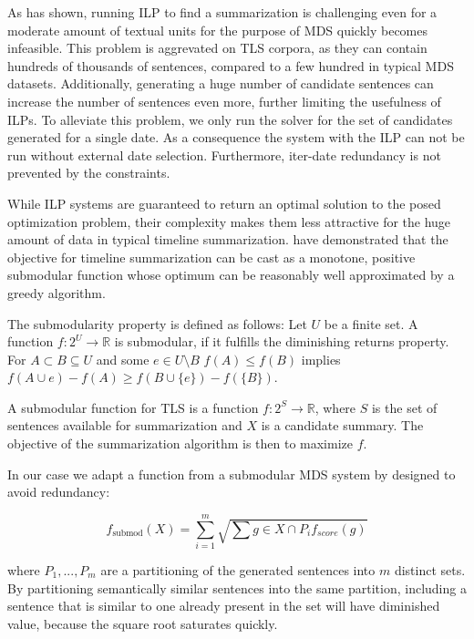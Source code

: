 \documentclass[a4paper,BCOR=10mm]{report}
\begin{document}
As \citet{mcdonald} has shown, running ILP to find a summarization is challenging even for a moderate amount of textual units for the purpose of MDS quickly becomes infeasible.
This problem is aggrevated on TLS corpora, as they can contain hundreds of thousands of sentences, compared to a few hundred in typical MDS datasets. Additionally, generating a huge number of candidate sentences can increase the number of sentences even more, further limiting the usefulness of ILPs.
To alleviate this problem, we only run the solver for the set of candidates generated for a single date. As a consequence the system with the ILP can not be run without external date selection. Furthermore, iter-date redundancy is not prevented by the constraints.


While ILP systems are guaranteed to return an optimal solution to the posed optimization problem, their complexity makes them less attractive for the huge amount of data in typical timeline summarization. \citet{markert} have demonstrated that the objective for timeline summarization can be cast as a monotone, positive submodular function whose optimum can be reasonably well approximated by a greedy algorithm.

The submodularity property is defined as follows:
 Let $U$ be a finite set. A function $f: 2^{U} \rightarrow \mathbb{R}$ is submodular, if it fulfills the diminishing returns property. For $A \subset B \subseteq U$ and some $e \in U \setminus B$ $f(A) \leq f(B)$ implies $f(A \cup e) - f(A) \geq f(B \cup \{e\}) - f(\{B\})$.

A submodular function for TLS is a function $f: 2^{S} \rightarrow \mathbb{R}$, where $S$ is the set of sentences available for summarization and $X$ is a candidate summary.
The objective of the summarization algorithm is then to maximize $f$.

In our case we adapt a function from a submodular MDS system by \citet{lin+blimes} designed to avoid redundancy:

\begin{displaymath}
f_{\text{submod}}(X) = \sum_{i = 1}^{m} \sqrt{\sum{g \in X \cap P_i} f_{score}(g)}
\end{displaymath}

where $P_1, ..., P_m$ are a partitioning of the generated sentences into $m$ distinct sets. By partitioning semantically similar sentences into the same partition, including a sentence that is similar to one already present in the set will have diminished value, because the square root saturates quickly.
\end{document}
